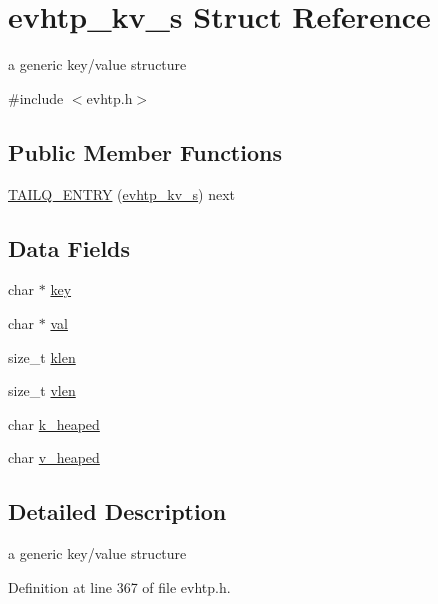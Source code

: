 \hypertarget{structevhtp__kv__s}{\section{evhtp\-\_\-kv\-\_\-s Struct Reference}
\label{structevhtp__kv__s}
}


a generic key/value structure  




{\ttfamily \#include $<$evhtp.\-h$>$}

\subsection*{Public Member Functions}
\begin{DoxyCompactItemize}
\item 
\hyperlink{structevhtp__kv__s_aa91b5703eb0b48670753f5c6fa38acfe}{T\-A\-I\-L\-Q\-\_\-\-E\-N\-T\-R\-Y} (\hyperlink{structevhtp__kv__s}{evhtp\-\_\-kv\-\_\-s}) next
\end{DoxyCompactItemize}
\subsection*{Data Fields}
\begin{DoxyCompactItemize}
\item 
char $\ast$ \hyperlink{structevhtp__kv__s_a5892a9181e6a332f84d27aecd41dcd12}{key}
\item 
char $\ast$ \hyperlink{structevhtp__kv__s_a1d80a43cb41e5b550d4563dd10d302bc}{val}
\item 
size\-\_\-t \hyperlink{structevhtp__kv__s_a70d958290b8b8ebaff45365d4e5b9e54}{klen}
\item 
size\-\_\-t \hyperlink{structevhtp__kv__s_ac59966c92d67690ef79403b9b2feab88}{vlen}
\item 
char \hyperlink{structevhtp__kv__s_a42db189a7e6b042589175ca83abe94f1}{k\-\_\-heaped}
\item 
char \hyperlink{structevhtp__kv__s_a220b69df8f7b820814ebda4c2df899d8}{v\-\_\-heaped}
\end{DoxyCompactItemize}


\subsection{Detailed Description}
a generic key/value structure 

Definition at line 367 of file evhtp.\-h.



